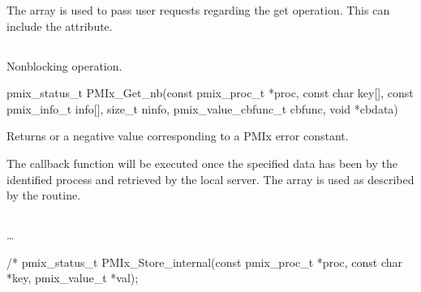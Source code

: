The  array is used to pass user requests regarding the get operation.
This can include the  attribute.


\subsection{}

\summary

Nonblocking  operation.

\format

\cspecificstart
\begin{codepar}
pmix_status_t
PMIx_Get_nb(const pmix_proc_t *proc, const char key[],
            const pmix_info_t info[], size_t ninfo,
            pmix_value_cbfunc_t cbfunc, void *cbdata)
\end{codepar}
\cspecificend

\begin{arglist}
\end{arglist}

Returns  or a negative value corresponding to a PMIx error constant.

\descr

The callback function will be executed once the specified data has been  by the identified process and retrieved by the local server.
The  array is used as described by the  routine.


\subsection{}

\summary

\ldots

\format

\cspecificstart
\begin{codepar}
/* 
pmix_status_t
PMIx_Store_internal(const pmix_proc_t *proc,
                    const char *key, pmix_value_t *val);
\end{codepar}
\cspecificend

